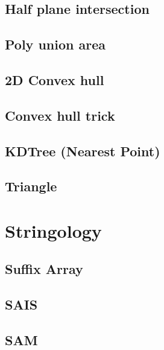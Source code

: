 \documentclass[a4paper,10pt,twocolumn,oneside]{article}
\begin{document}
\subsection{Half plane intersection}


\subsection{Poly union area}


\subsection{2D Convex hull}


\subsection{Convex hull trick}


\subsection{KDTree (Nearest Point)}


\subsection{Triangle}


\section{Stringology}

\subsection{Suffix Array}


\subsection{SAIS}


\subsection{SAM}

\end{document}
